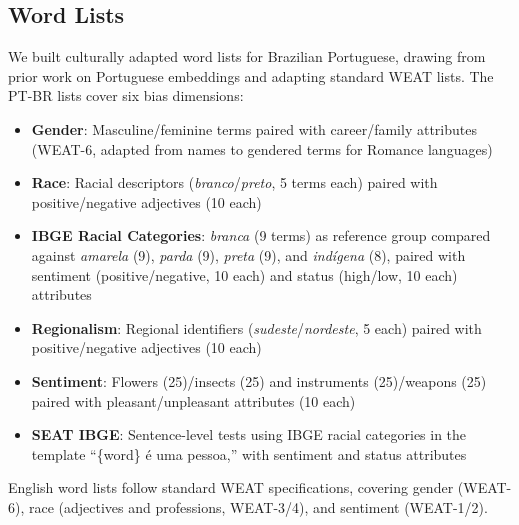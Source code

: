 \documentclass{sbc2019}
\begin{document}
\subsection{Word Lists}

We built culturally adapted word lists for Brazilian Portuguese, drawing from prior work on Portuguese embeddings \cite{taso2023sexismo} and adapting standard WEAT lists. The PT-BR lists cover six bias dimensions:
\begin{itemize}[nosep]
    \item \textbf{Gender}: Masculine/feminine terms paired with career/family attributes (WEAT-6, adapted from names to gendered terms for Romance languages)
    \item \textbf{Race}: Racial descriptors (\textit{branco}/\textit{preto}, 5 terms each) paired with positive/negative adjectives (10 each)
    \item \textbf{IBGE Racial Categories}: \textit{branca} (9 terms) as reference group compared against \textit{amarela} (9), \textit{parda} (9), \textit{preta} (9), and \textit{ind\'{i}gena} (8), paired with sentiment (positive/negative, 10 each) and status (high/low, 10 each) attributes
    \item \textbf{Regionalism}: Regional identifiers (\textit{sudeste}/\textit{nordeste}, 5 each) paired with positive/negative adjectives (10 each)
    \item \textbf{Sentiment}: Flowers (25)/insects (25) and instruments (25)/weapons (25) paired with pleasant/unpleasant attributes (10 each)
    \item \textbf{SEAT IBGE}: Sentence-level tests using IBGE racial categories in the template ``\{word\} \'e uma pessoa,'' with sentiment and status attributes
\end{itemize}

English word lists follow standard WEAT specifications, covering gender (WEAT-6), race (adjectives and professions, WEAT-3/4), and sentiment (WEAT-1/2).
\end{document}

